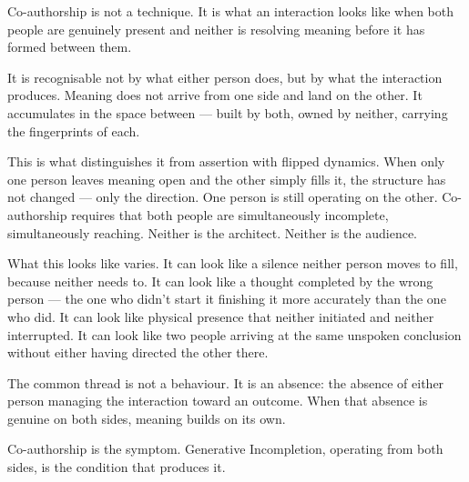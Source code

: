 Co-authorship is not a technique. It is what an interaction looks like 
when both people are genuinely present and neither is resolving meaning 
before it has formed between them.

It is recognisable not by what either person does, but by what the 
interaction produces. Meaning does not arrive from one side and land 
on the other. It accumulates in the space between --- built by both, 
owned by neither, carrying the fingerprints of each.

This is what distinguishes it from assertion with flipped dynamics. 
When only one person leaves meaning open and the other simply fills it, 
the structure has not changed --- only the direction. One person is still 
operating on the other. Co-authorship requires that both people are 
simultaneously incomplete, simultaneously reaching. Neither is the 
architect. Neither is the audience.

What this looks like varies. It can look like a silence neither person 
moves to fill, because neither needs to. It can look like a thought 
completed by the wrong person --- the one who didn't start it finishing 
it more accurately than the one who did. It can look like physical 
presence that neither initiated and neither interrupted. It can look 
like two people arriving at the same unspoken conclusion without 
either having directed the other there.

The common thread is not a behaviour. It is an absence: the absence 
of either person managing the interaction toward an outcome. When that 
absence is genuine on both sides, meaning builds on its own. 

Co-authorship is the symptom. Generative Incompletion, operating 
from both sides, is the condition that produces it.